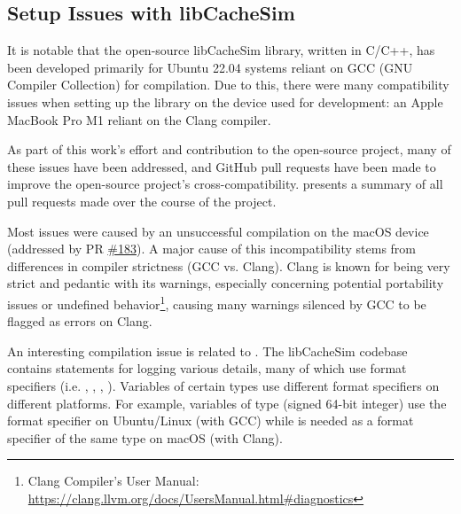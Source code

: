 \subsection{Setup Issues with libCacheSim}\label{sec:setup-issues}

It is notable that the open-source libCacheSim library, written in C/C++, has been developed primarily for Ubuntu 22.04 systems reliant on GCC (GNU Compiler Collection) for compilation. Due to this, there were many compatibility issues when setting up the library on the device used for development: an Apple MacBook Pro M1 reliant on the Clang compiler. 

As part of this work's effort and contribution to the open-source project, many of these issues have been addressed, and GitHub pull requests have been made to improve the open-source project's cross-compatibility.  presents a summary of all pull requests made over the course of the project.

Most issues were caused by an unsuccessful compilation on the macOS device (addressed by PR \href{https://github.com/1a1a11a/libCacheSim/pull/183}{\#183}). A major cause of this incompatibility stems from differences in compiler strictness (GCC vs. Clang). Clang is known for being very strict and pedantic with its warnings, especially concerning potential portability issues or undefined behavior\footnote{Clang Compiler's User Manual: \url{https://clang.llvm.org/docs/UsersManual.html\#diagnostics}}, causing many warnings silenced by GCC to be flagged as errors on Clang.

An interesting compilation issue is related to . The libCacheSim codebase contains  statements for logging various details, many of which use format specifiers (i.e. , , , ). Variables of certain types use different format specifiers on different platforms. For example, variables of type  (signed 64-bit integer) use the  format specifier on Ubuntu/Linux (with GCC) while  is needed as a format specifier of the same type on macOS (with Clang). 

